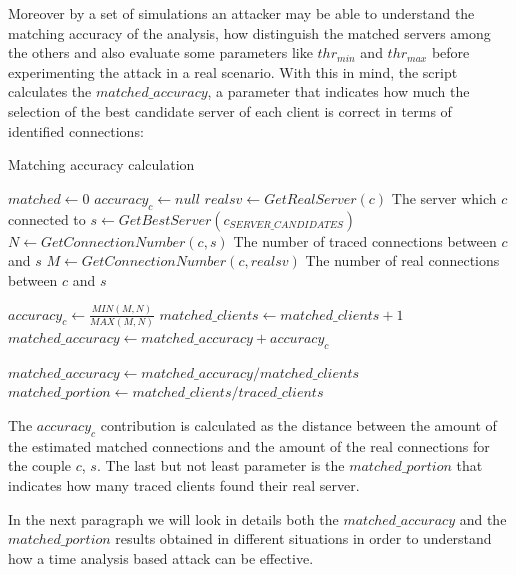 Moreover by a set of simulations
an attacker may be able to understand the matching accuracy of the analysis, how distinguish the
matched servers among the others and also evaluate some
parameters like $thr_{min}$ and $thr_{max}$ before 
experimenting the attack in a real scenario. 
With this in mind, the script
calculates the $matched\_accuracy$, a parameter that indicates how much
the selection of the best candidate server of each client is correct in terms of identified
connections:

\begin{algorithm}[H]
\caption{Matching accuracy calculation}
\begin{algorithmic}
\State $matched \gets 0$
	\State $accuracy_c \gets null$
	\State $realsv \gets GetRealServer(c)$ 
	{\footnotesize \Comment The server which $c$ connected to}
	\State $s \gets GetBestServer(c_{SERVER\_CANDIDATES})$
		\State $N \gets GetConnectionNumber(c, s) $ 
		{\footnotesize \Comment The number of traced connections between $c$ and $s$}
		\State $M \gets GetConnectionNumber(c, realsv)$ 
		{\footnotesize \Comment The number of real connections between $c$ and $s$}

		\State $accuracy_c \gets \frac{ MIN(M, N)}{MAX(M, N)}$
	\EndIf
		\State $matched\_clients \gets matched\_clients + 1$
		\State $matched\_accuracy \gets matched\_accuracy + accuracy_c$
	\EndIf	
\EndFor

\State $matched\_accuracy \gets matched\_accuracy / matched\_clients$
\State $matched\_portion \gets matched\_clients / traced\_clients$

\end{algorithmic}
\label{alg:maccuracy}
\end{algorithm}
 
The $accuracy_c$ contribution is calculated as the distance between the 
amount of the estimated matched connections
and the amount of the real connections for the couple $c$, $s$.
The last but not least parameter is the $matched\_portion$ that indicates
how many traced clients found their real server.


In the next paragraph we will look in details both the
$matched\_accuracy$ and the
$matched\_portion$
results obtained in different situations in order to understand how a
time analysis based attack can be effective.

